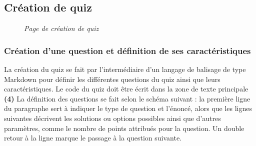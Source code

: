 \documentclass[a4paper,11pt,openany,oneside]{sphinxmanual}
\begin{document}
\subsection{Création de quiz}
\label{doc-user:creation-de-quiz}\begin{figure}[htbp]
\centering
\capstart

\caption{\emph{Page de création de quiz}}\end{figure}


\subsubsection{Création d'une question et définition de ses caractéristiques}
\label{doc-user:creation-d-une-question-et-definition-de-ses-caracteristiques}
La création du quiz se fait par l'intermédiaire d'un langage de balisage de type Markdown pour définir les différentes questions du quiz ainsi que leurs caractéristiques. Le code du quiz doit être écrit dans la zone de texte principale \textbf{(4)} La définition des questions se fait selon le schéma suivant : la première ligne du paragraphe sert à indiquer le type de question et l'énoncé, alors que les lignes suivantes décrivent les solutions ou options possibles ainsi que d'autres paramètres, comme le nombre de points attribués pour la question. Un double retour à la ligne marque le passage à la question suivante.
\end{document}
